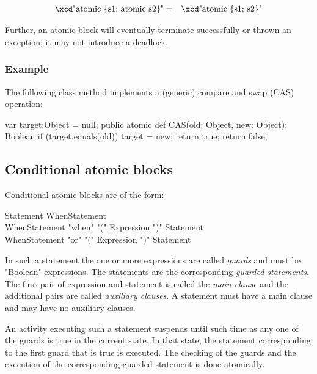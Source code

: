 {\begin{eqnarray}
 \mbox{\xcd"atomic \{s1; atomic s2\}"} &=& \mbox{\xcd"atomic \{s1; s2\}"}
\end{eqnarray}

Further, an atomic block will eventually terminate successfully or
thrown an exception; it may not introduce a deadlock.

\subsubsection{Example}

The following class method implements a (generic) compare and swap (CAS) operation:



\begin{xten}
var target:Object = null;
public atomic def CAS(old: Object, new: Object): Boolean {
   if (target.equals(old)) {
     target = new;
     return true;
   }
   return false;
}
\end{xten}

\subsection{Conditional atomic blocks}

Conditional atomic blocks are of the form:

\begin{grammar}
Statement \:  WhenStatement \\
WhenStatement \:  \xcd"when" \xcd"(" Expression \xcd")" Statement \\
            \| WhenStatement \xcd"or" \xcd"(" Expression \xcd")" Statement 
\end{grammar}

In such a statement the one or more expressions are called {\em
guards} and must be \xcd"Boolean" expressions. The statements are the
corresponding {\em guarded statements}. The first pair of expression
and statement is called the {\em main clause} and the additional pairs
are called {\em auxiliary clauses}. A statement must have a main
clause and may have no auxiliary clauses.

An activity executing such a statement suspends until such time as any
one of the guards is true in the current state. In that state, the
statement corresponding to the first guard that is true is executed.
The checking of the guards and the execution of the corresponding
guarded statement is done atomically. 


}

